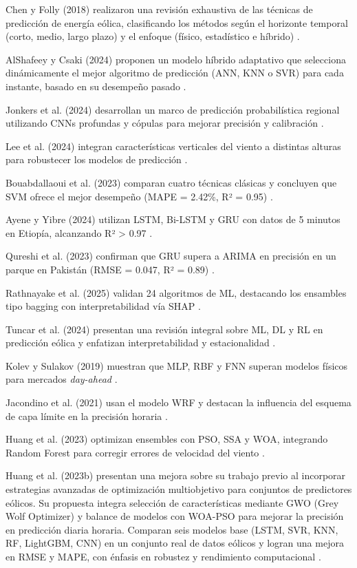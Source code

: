 \documentclass[conference]{IEEEtran}
\begin{document}
	Chen y Folly (2018) realizaron una revisión exhaustiva de las técnicas de predicción de energía eólica, clasificando los métodos según el horizonte temporal (corto, medio, largo plazo) y el enfoque (físico, estadístico e híbrido) \cite{chen2018wind}.
	
	AlShafeey y Csaki (2024) proponen un modelo híbrido adaptativo que selecciona dinámicamente el mejor algoritmo de predicción (ANN, KNN o SVR) para cada instante, basado en su desempeño pasado \cite{alshafeey2024adaptive}.
	
	Jonkers et al. (2024) desarrollan un marco de predicción probabilística regional utilizando CNNs profundas y cópulas para mejorar precisión y calibración \cite{jonkers2024probabilistic}.
	
	Lee et al. (2024) integran características verticales del viento a distintas alturas para robustecer los modelos de predicción \cite{lee2024vertical}.
	
	Bouabdallaoui et al. (2023) comparan cuatro técnicas clásicas y concluyen que SVM ofrece el mejor desempeño (MAPE = 2.42\%, R² = 0.95) \cite{bouabdallaoui2023application}.
	
	Ayene y Yibre (2024) utilizan LSTM, Bi-LSTM y GRU con datos de 5 minutos en Etiopía, alcanzando R² > 0.97 \cite{ayene2024wind}.
	
	Qureshi et al. (2023) confirman que GRU supera a ARIMA en precisión en un parque en Pakistán (RMSE = 0.047, R² = 0.89) \cite{qureshi2023shortterm}.
	
	Rathnayake et al. (2025) validan 24 algoritmos de ML, destacando los ensambles tipo bagging con interpretabilidad vía SHAP \cite{rathnayake2025predicting}.
	
	Tuncar et al. (2024) presentan una revisión integral sobre ML, DL y RL en predicción eólica y enfatizan interpretabilidad y estacionalidad \cite{tuncar2024review}.
	
	Kolev y Sulakov (2019) muestran que MLP, RBF y FNN superan modelos físicos para mercados \textit{day-ahead} \cite{kolev2019forecasting}.
	
	Jacondino et al. (2021) usan el modelo WRF y destacan la influencia del esquema de capa límite en la precisión horaria \cite{jacondino2021hourly}.
	
	Huang et al. (2023) optimizan ensembles con PSO, SSA y WOA, integrando Random Forest para corregir errores de velocidad del viento \cite{huang2023ensemble}.
	
	Huang et al. (2023b) presentan una mejora sobre su trabajo previo al incorporar estrategias avanzadas de optimización multiobjetivo para conjuntos de predictores eólicos. Su propuesta integra selección de características mediante GWO (Grey Wolf Optimizer) y balance de modelos con WOA-PSO para mejorar la precisión en predicción diaria horaria. Comparan seis modelos base (LSTM, SVR, KNN, RF, LightGBM, CNN) en un conjunto real de datos eólicos y logran una mejora en RMSE y MAPE, con énfasis en robustez y rendimiento computacional \cite{huang2023multiobjective}.
	
\end{document}
